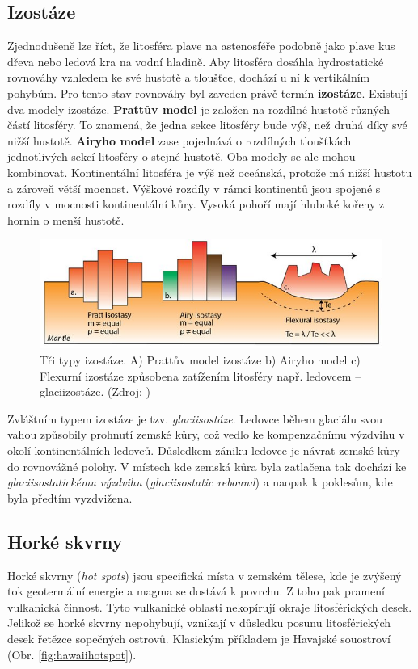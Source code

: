 \subsection{Izostáze}
Zjednodušeně lze říct, že litosféra plave na astenosféře podobně jako plave kus dřeva nebo ledová kra na vodní hladině. Aby litosféra dosáhla hydrostatické rovnováhy vzhledem ke své hustotě a tloušťce, dochází u ní k vertikálním pohybům. Pro tento stav rovnováhy byl zaveden právě termín \textbf{izostáze}. Existují dva modely izostáze. \textbf{Prattův model} je založen na rozdílné hustotě různých částí litosféry. To znamená, že jedna sekce litosféry bude výš, než druhá díky své nižší hustotě. \textbf{Airyho model} zase pojednává o rozdílných tloušťkách jednotlivých sekcí litosféry o stejné hustotě. Oba modely se ale mohou kombinovat. Kontinentální litosféra je výš než oceánská, protože má nižší hustotu a zároveň větší mocnost. Výškové rozdíly v rámci kontinentů jsou spojené s rozdíly v mocnosti kontinentální kůry. Vysoká pohoří mají hluboké kořeny z hornin o menší hustotě.
\begin{figure}[h]
	\centering
	\includegraphics[width=1\linewidth]{obrazky/tectonic/isostasy}
	\caption{Tři typy izostáze. A) Prattův model izostáze b) Airyho model c) Flexurní izostáze způsobena zatížením litosféry např. ledovcem -- glaciizostáze. (Zdroj: \textcite{beniestContinentalRiftingConjugate2017})}
	\label{fig:isostasy}
\end{figure}

Zvláštním typem izostáze je tzv. \emph{glaciisostáze}. Ledovce během glaciálu svou vahou způsobily prohnutí zemské kůry, což vedlo ke kompenzačnímu výzdvihu v okolí kontinentálních ledovců. Důsledkem zániku ledovce je návrat zemské kůry do rovnovážné polohy. V místech kde zemská kůra byla zatlačena tak dochází ke \emph{glaciisostatickému výzdvihu} (\textit{glaciisostatic rebound}) a naopak k poklesům, kde byla předtím vyzdvižena.
\subsection{Horké skvrny}
Horké skvrny (\textit{hot spots}) jsou specifická místa v zemském tělese, kde je zvýšený tok geotermální energie a magma se dostává k povrchu. Z toho pak pramení vulkanická činnost. Tyto vulkanické oblasti nekopírují okraje litosférických desek. Jelikož se horké skvrny nepohybují, vznikají v důsledku posunu litosférických desek řetězce sopečných ostrovů. Klasickým příkladem je Havajské souostroví (Obr. \ref{fig:hawaiihotspot}).

